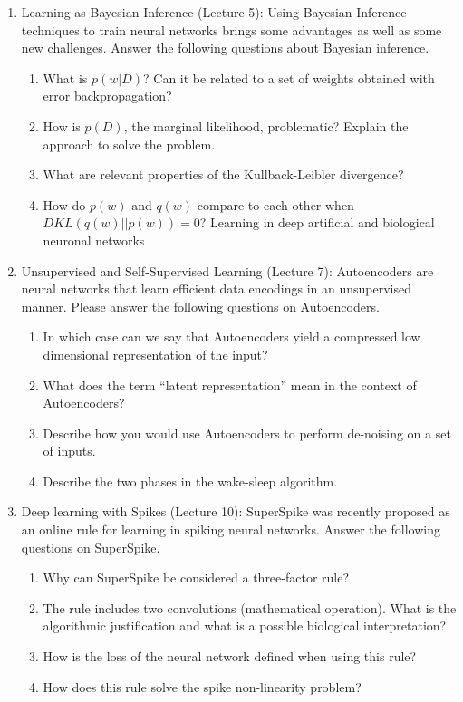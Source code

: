 \documentclass[main]{subfiles}
\begin{document}
\begin{enumerate}
    \item Learning as Bayesian Inference (Lecture 5):
    Using Bayesian Inference techniques to train neural networks brings some advantages as well as some new challenges. Answer the following questions about Bayesian inference.
  \begin{enumerate}[label*=\arabic*.]
    \item What is $p(w|D)$? Can it be related to a set of weights obtained with error backpropagation?
    \item How is $p(D)$, the marginal likelihood, problematic? Explain the approach to solve the problem.
    \item What are relevant properties of the Kullback-Leibler divergence?
    \item How do $p(w)$ and $q(w)$ compare to each other when $D KL (q(w)||p(w)) = 0$? Learning in deep artificial and biological neuronal networks
  \end{enumerate}

    \item Unsupervised and Self-Supervised Learning (Lecture 7):
    Autoencoders are neural networks that learn efficient data encodings in an unsupervised manner. Please answer the following questions on Autoencoders.
  \begin{enumerate}[label*=\arabic*.]
    \item In which case can we say that Autoencoders yield a compressed low dimensional representation of the input?
    \item What does the term “latent representation” mean in the context of Autoencoders?
    \item Describe how you would use Autoencoders to perform de-noising on a set of inputs.
    \item Describe the two phases in the wake-sleep algorithm.
  \end{enumerate}

    \item Deep learning with Spikes (Lecture 10):
    SuperSpike was recently proposed as an online rule for learning in spiking neural networks. Answer the following questions on SuperSpike.
  \begin{enumerate}[label*=\arabic*.]
    \item Why can SuperSpike be considered a three-factor rule?
    \item The rule includes two convolutions (mathematical operation). What is the algorithmic justification and what is a possible biological interpretation?
    \item How is the loss of the neural network defined when using this rule?
    \item How does this rule solve the spike non-linearity problem?
  \end{enumerate}


\end{enumerate}
\end{document}
